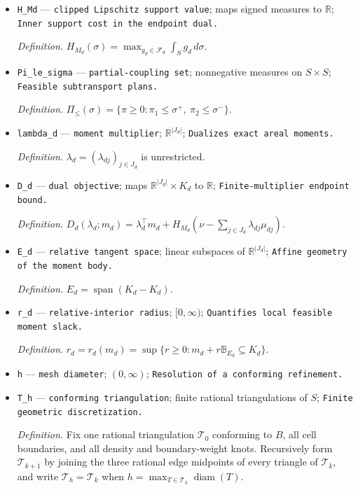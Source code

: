 \documentclass{article}
\begin{document}
\begin{itemize}
  \par\smallskip\noindent\emph{Definition.} \(\sigma^-\) is the negative part of \(\sigma\).
  \item \texttt{H\_\allowbreak{}Md} --- \texttt{clipped Lipschitz support value}; maps signed measures to \(\mathbb R\); \texttt{Inner support cost in the endpoint dual.}
  \par\smallskip\noindent\emph{Definition.} \(H_{M_d}(\sigma)=\max_{g_d\in\mathcal F_d}\int_S g_d\,d\sigma\).
  \item \texttt{Pi\_\allowbreak{}le\_\allowbreak{}sigma} --- \texttt{partial-\allowbreak{}coupling set}; nonnegative measures on \(S\times S\); \texttt{Feasible subtransport plans.}
  \par\smallskip\noindent\emph{Definition.} \(\Pi_{\le}(\sigma)=\{\pi\ge0:\pi_1\le\sigma^+,\ \pi_2\le\sigma^-\}\).
  \item \texttt{lambda\_\allowbreak{}d} --- \texttt{moment multiplier}; \(\mathbb R^{|J_d|}\); \texttt{Dualizes exact areal moments.}
  \par\smallskip\noindent\emph{Definition.} \(\lambda_d=(\lambda_{dj})_{j\in J_d}\) is unrestricted.
  \item \texttt{D\_\allowbreak{}d} --- \texttt{dual objective}; maps \(\mathbb R^{|J_d|}\times K_d\) to \(\mathbb R\); \texttt{Finite-\allowbreak{}multiplier endpoint bound.}
  \par\smallskip\noindent\emph{Definition.} \(D_d(\lambda_d;m_d)=\lambda_d^\top m_d+H_{M_d}(\nu-\sum_{j\in J_d}\lambda_{dj}\mu_{dj})\).
  \item \texttt{E\_\allowbreak{}d} --- \texttt{relative tangent space}; linear subspaces of \(\mathbb R^{|J_d|}\); \texttt{Affine geometry of the moment body.}
  \par\smallskip\noindent\emph{Definition.} \(E_d=\operatorname{span}(K_d-K_d)\).
  \item \texttt{r\_\allowbreak{}d} --- \texttt{relative-\allowbreak{}interior radius}; \([0,\infty)\); \texttt{Quantifies local feasible moment slack.}
  \par\smallskip\noindent\emph{Definition.} \(r_d=r_d(m_d)=\sup\{r\ge0:m_d+r\mathbb B_{E_d}\subseteq K_d\}\).
  \item \texttt{h} --- \texttt{mesh diameter}; \((0,\infty)\); \texttt{Resolution of a conforming refinement.}
  \item \texttt{T\_\allowbreak{}h} --- \texttt{conforming triangulation}; finite rational triangulations of \(S\); \texttt{Finite geometric discretization.}
  \par\smallskip\noindent\emph{Definition.} Fix one rational triangulation \(\mathcal T_0\) conforming to \(B\), all cell boundaries, and all density and boundary-weight knots. Recursively form \(\mathcal T_{k+1}\) by joining the three rational edge midpoints of every triangle of \(\mathcal T_k\), and write \(\mathcal T_h=\mathcal T_k\) when \(h=\max_{T\in\mathcal T_k}\operatorname{diam}(T)\).

\end{itemize}
\end{document}

